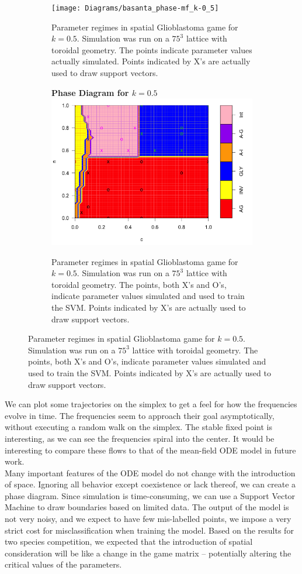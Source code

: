 \documentclass[12pt]{report}
\begin{document}
\begin{figure}[H]

	\begin{subfigure}[b]{0.8 \textwidth}
	\centering
	\texttt{[image: Diagrams/basanta\_phase-mf\_k-0\_5]}
	\caption{Parameter regimes in spatial Glioblastoma game for $k = 0.5$. Simulation was run on a $75^3$ lattice with toroidal geometry. The points indicate parameter values actually simulated. Points indicated by X's are actually used to draw support vectors.}
	\end{subfigure}

	\begin{subfigure}[b]{0.8\textwidth}
	\centering
	\textbf{Phase Diagram for $k = 0.5$}
	\includegraphics[width = 0.9 \linewidth]{Diagrams/basanta_phase}
	\caption{Parameter regimes in spatial Glioblastoma game for $k = 0.5$. Simulation was run on a $75^3$ lattice with toroidal geometry. The points, both X's and O's, indicate parameter values simulated and used to train the SVM. Points indicated by X's are actually used to draw support vectors.}
	\end{subfigure}
\end{figure}


 We can plot some trajectories on the simplex to get a feel for how the frequencies evolve in time. The frequencies seem to approach their goal asymptotically, without executing a random walk on the simplex. The stable fixed point is interesting, as we can see the frequencies spiral into the center. It would be interesting to compare these flows to that of the mean-field ODE model in future work. \\

Many important features of the ODE model do not change with the introduction of space. Ignoring all behavior except coexistence or lack thereof, we can create a phase diagram. Since simulation is time-consuming, we can use a Support Vector Machine \cite{e1071} to draw boundaries based on limited data. The output of the model is not very noisy, and we expect to have few mis-labelled points, we impose a very strict cost for misclassification when training the model. Based on the results for two species competition, we expected that the introduction of spatial consideration will be like a change in the game matrix -- potentially altering the critical values of the parameters. \\
\end{document}
